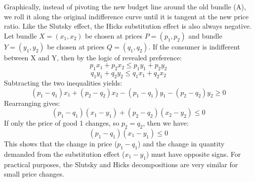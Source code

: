 Graphically, instead of pivoting the new budget line around the old bundle (A), we roll it along the original indifference curve until it is tangent at the new price ratio.
Like the Slutsky effect, the Hicks substitution effect is also always negative. Let bundle \(X = (x_1, x_2)\) be chosen at prices \(P=(p_1, p_2)\) and bundle \(Y=(y_1, y_2)\) be chosen at prices \(Q=(q_1, q_2)\). If the consumer is indifferent between X and Y, then by the logic of revealed preference:
\[
p_1 x_1 + p_2 x_2 \leq p_1 y_1 + p_2 y_2
\]
\[
q_1 y_1 + q_2 y_2 \leq q_1 x_1 + q_2 x_2
\]
Subtracting the two inequalities yields:
\[
(p_1 - q_1)x_1 + (p_2 - q_2)x_2 - (p_1 - q_1)y_1 - (p_2 - q_2)y_2 \geq 0
\]
Rearranging gives:
\[
(p_1 - q_1)(x_1 - y_1) + (p_2 - q_2)(x_2 - y_2) \leq 0
\]
If only the price of good 1 changes, so \(p_2 = q_2\), then we have:
\[
(p_1 - q_1)(x_1 - y_1) \leq 0
\]
This shows that the change in price (\(p_1 - q_1\)) and the change in quantity demanded from the substitution effect (\(x_1 - y_1\)) must have opposite signs. For practical purposes, the Slutsky and Hicks decompositions are very similar for small price changes.